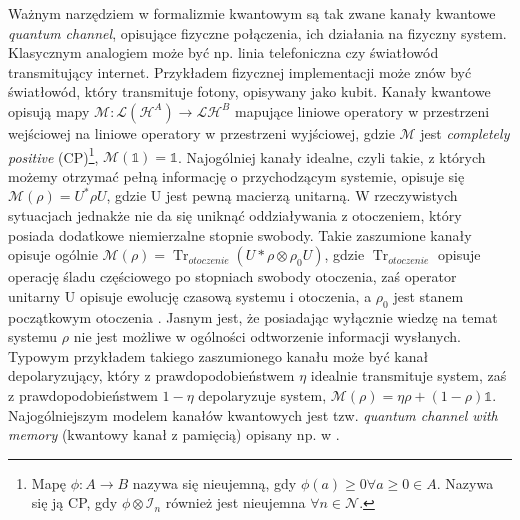 \documentclass[10pt]{article} %
\DeclareMathOperator{\Trs}{Tr}
\newcommand{\Hx}[1]{\mathcal{H}^{#1}}
\newcommand{\I}{\mathbb{1}}
\begin{document}
Ważnym narzędziem w formalizmie kwantowym są tak zwane kanały kwantowe \textit{quantum channel}, opisujące fizyczne połączenia, ich działania na fizyczny system. Klasycznym analogiem może być np. linia telefoniczna czy światłowód transmitujący internet. 
Przykładem fizycznej implementacji może znów być światłowód, który transmituje fotony, opisywany jako kubit. 
Kanały kwantowe opisują mapy $\mathcal{M}: \mathcal{L}(\Hx{A}) \to \mathcal{L}{\Hx{B}}$ mapujące liniowe operatory w przestrzeni wejściowej na liniowe operatory w przestrzeni wyjściowej, gdzie $\mathcal{M}$ jest \textit{completely positive} (CP)\footnote
{
Mapę $\phi: A \to B$ nazywa się nieujemną, gdy $\phi(a) \geq 0 \forall a\geq 0 \in A$. Nazywa się ją CP, gdy $\phi \otimes \mathcal{I}_n$ również jest nieujemna $\forall n \in \mathcal{N}$.
}, $\mathcal{M}(\mathbb{1}) = \mathbb{1}$. Najogólniej kanały idealne, czyli takie, z których możemy otrzymać pełną informację o przychodzącym systemie, opisuje się $\mathcal{M}(\rho) = U^* \rho U$, gdzie U jest pewną macierzą unitarną. W rzeczywistych sytuacjach jednakże nie da się uniknąć
oddziaływania z otoczeniem, który posiada dodatkowe niemierzalne stopnie swobody. Takie zaszumione kanały opisuje ogólnie $\mathcal{M}(\rho) = \Trs_{otoczenie}(U* \rho \otimes \rho_0 U)$, gdzie $\Trs_{otoczenie}$ opisuje operację śladu częściowego po stopniach swobody otoczenia, zaś operator unitarny U
opisuje ewolucję czasową systemu i otoczenia, a $\rho_0$ jest stanem początkowym otoczenia \cite{fund}. Jasnym jest, że posiadając wyłącznie wiedzę na temat systemu $\rho$ nie jest możliwe w ogólności odtworzenie informacji wysłanych.
Typowym przykładem takiego zaszumionego kanału może być kanał depolaryzujący, który z prawdopodobieństwem $\eta$ idealnie transmituje system, zaś z prawdopodobieństwem $1-\eta$ depolaryzuje system, $\mathcal{M}(\rho) = \eta\rho+(1-\rho)\I$. Najogólniejszym modelem kanałów kwantowych jest tzw.
\textit{quantum channel with memory} (kwantowy kanał z pamięcią) opisany np. w \cite{memory}.

\end{document}
